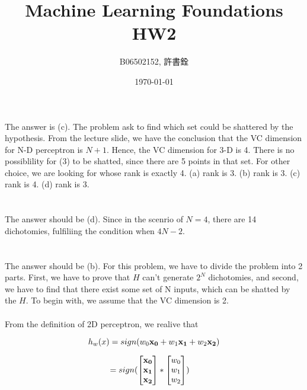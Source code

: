 \documentclass{article}
\title{Machine Learning Foundations HW2}
\author{B06502152, 許書銓}
\date{\today}
\begin{document}
\begin{CJK*}{UTF8}{bsmi}
\maketitle
\hrulefill
\section{}%
The answer is (c). The problem ask to find which set could be shattered by the hypothesis. From the lecture slide, we have the conclusion that the VC dimension for N-D perceptron is $N+1$. Hence, the VC dimension for 3-D is 4. There is no possiblility for (3) to be shatted, since there are 5 points in that set. For other choice, we are looking for whose rank is exactly 4. (a) rank is 3. (b) rank is 3. (c) rank is 4. (d) rank is 3. 

\section{}%
The answer should be (d). Since in the scenrio of $N = 4$, there are 14 dichotomies, fulfiliing the condition when $4N -2$.

\section{}%
The answer should be (b). For this problem, we have to divide the problem into 2 parts. First, we have to prove that $H$ can't generate $2^N$ dichotomies, and second, we have to find that there exist some set of N inputs, which can be shatted by the $H$. To begin with, we assume that the VC dimension is 2.\\
\\
From the definition of 2D perceptron, we realive that

\begin{displaymath} 
	h_w(x) = sign(w_0 {\bf x_0} + w_1{\bf x_1}  + w_2{\bf x_2} )
\end{displaymath}  

\begin{displaymath} 
	= sign ( \begin{bmatrix}  {\bf x_0}\\ {\bf x_1}\\ {\bf x_2} \end{bmatrix} * \begin{bmatrix}  w_0\\w_1\\w_2 \end{bmatrix})\quad
\end{displaymath} 



\end{CJK*}
\end{document}
